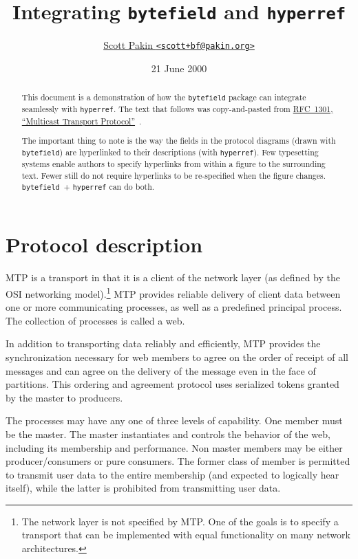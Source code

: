 \documentclass[11pt]{article}
\title{Integrating \texttt{bytefield} and \texttt{hyperref}}
\author{\href{http://www.pakin.org/~scott}{Scott Pakin 
  \texttt{<scott+bf@pakin.org>}}}
\date{21 June 2000}
\begin{document}
\sloppy
\maketitle

\begin{abstract}
This document is a demonstration of how the \texttt{bytefield} package can
integrate seamlessly with \texttt{hyperref}.  The text that follows was
copy-and-pasted from
\href{http://www.rfc-editor.org/rfc/rfc1301.txt}{RFC~1301, ``Multicast
Transport Protocol''}~\cite{Armstrong92}.

The important thing to note is the way the fields in the protocol diagrams
(drawn with \texttt{bytefield}) are hyperlinked to their descriptions (with
\texttt{hyperref}).  Few typesetting systems enable authors to specify
hyperlinks from within a figure to the surrounding text.  Fewer still do
not require hyperlinks to be re-specified when the figure changes.
\texttt{bytefield}~+ \texttt{hyperref} can do both.
\end{abstract}


\setcounter{section}{1}

\section{Protocol description}

   MTP is a transport in that it is a client of the network layer (as
   defined by the OSI networking model).\footnote{The network layer is not
   specified by MTP. One of the goals is to specify a transport that can be
   implemented with equal functionality on many network architectures.}
   MTP provides reliable delivery of client data between one or more
   communicating processes, as well as a predefined principal process. The
   collection of processes is called a web.

   In addition to transporting data reliably and efficiently, MTP
   provides the synchronization necessary for web members to agree on
   the order of receipt of all messages and can agree on the delivery of
   the message even in the face of partitions.  This ordering and
   agreement protocol uses serialized tokens granted by the master to
   producers.

   The processes may have any one of three levels of capability. One
   member must be the master. The master instantiates and controls the
   behavior of the web, including its membership and performance. Non
   master members may be either producer/consumers or pure consumers.
   The former class of member is permitted to transmit user data to the
   entire membership (and expected to logically hear itself), while the
   latter is prohibited from transmitting user data.
\end{document}
